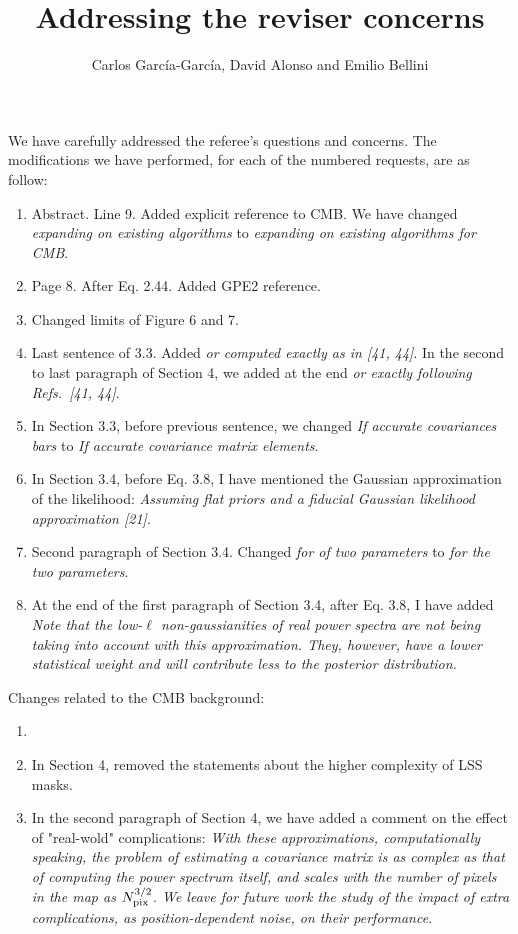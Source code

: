 \documentclass[a4paper]{article}
\title{Addressing the reviser concerns}
\author{Carlos Garc\'ia-Garc\'ia, David Alonso and Emilio Bellini}
\newcommand{\cgg}[1]{\textcolor{midgreen}{#1}}
\begin{document}
\maketitle
We have carefully addressed the referee's questions and concerns. The
modifications we have performed, for each of the numbered requests, are as
follow:
\begin{enumerate}
  \item  Abstract. Line 9. Added explicit reference to CMB. We have changed
    \textit{expanding on existing algorithms} to \textit{expanding on existing algorithms \cgg{for CMB}}.
  \item  Page 8. After Eq. 2.44. Added GPE2 reference.
  \item  Changed limits of Figure 6 and 7.
  \item  Last sentence of 3.3. Added \textit{or computed exactly as in [41,
      44]}. In the second to last paragraph of Section 4, we added at the end
    \textit{or exactly following Refs.~[41, 44]}.
  \item  In Section 3.3, before previous sentence, we changed \textit{If accurate
    covariances bars} to \textit{If accurate covariance matrix \cgg{elements}}.
\item  In Section 3.4, before Eq. 3.8, I have mentioned the Gaussian
  approximation of the likelihood: \textit{Assuming flat priors \cgg{and a
      fiducial Gaussian likelihood approximation [21]}}.
  \item  Second paragraph of Section 3.4. Changed \textit{for of two
      parameters} to \textit{for the \cgg{two} parameters}.
  \item  At the end of the first paragraph of Section 3.4,  after Eq. 3.8, I
    have added \textit{\cgg{Note that the low-$\ell$ non-gaussianities of real power spectra
        are not being taking into account with this approximation. They,
        however, have a lower statistical weight and will contribute less to
        the posterior distribution.}
}

\end{enumerate}

Changes related to the CMB background:
\begin{enumerate}
  \item  
  \item In Section 4, removed the statements about the higher complexity of LSS
    masks.
  \item  In the second paragraph of Section 4, we have added a comment on the
    effect of "real-wold" complications: \textit{With these
    approximation\cgg{s}, computationally speaking, the problem of estimating a
    covariance matrix is as complex as that of computing the power spectrum
    itself, and scales with the number of pixels in the map as $N_{\rm
      pix}^{3/2}$. \cgg{We leave for future work the study of the impact of
      extra complications, as position-dependent noise, on their performance.}
}
\end{enumerate}
\end{document}
